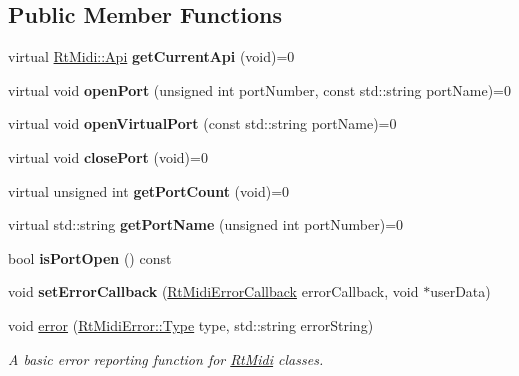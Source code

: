 \subsection*{Public Member Functions}
\begin{DoxyCompactItemize}
\item 
virtual \hyperlink{class_rt_midi_aac66af04a85fe5c5f07c360574a19406}{Rt\+Midi\+::\+Api} {\bfseries get\+Current\+Api} (void)=0\hypertarget{class_midi_api_a9913ffc5863dbb4ac6d4e81d046c665a}{}\label{class_midi_api_a9913ffc5863dbb4ac6d4e81d046c665a}

\item 
virtual void {\bfseries open\+Port} (unsigned int port\+Number, const std\+::string port\+Name)=0\hypertarget{class_midi_api_a0c4a5ef7ab6ff7d223b96671422e352c}{}\label{class_midi_api_a0c4a5ef7ab6ff7d223b96671422e352c}

\item 
virtual void {\bfseries open\+Virtual\+Port} (const std\+::string port\+Name)=0\hypertarget{class_midi_api_a772dc26ec412c19facb71b85db2927fd}{}\label{class_midi_api_a772dc26ec412c19facb71b85db2927fd}

\item 
virtual void {\bfseries close\+Port} (void)=0\hypertarget{class_midi_api_a1410af774a6bcdf85726eb69b94bc918}{}\label{class_midi_api_a1410af774a6bcdf85726eb69b94bc918}

\item 
virtual unsigned int {\bfseries get\+Port\+Count} (void)=0\hypertarget{class_midi_api_a98661c935d597e8ba19ed266287868f5}{}\label{class_midi_api_a98661c935d597e8ba19ed266287868f5}

\item 
virtual std\+::string {\bfseries get\+Port\+Name} (unsigned int port\+Number)=0\hypertarget{class_midi_api_a317393a9094e7c2bf51337adbabe6a71}{}\label{class_midi_api_a317393a9094e7c2bf51337adbabe6a71}

\item 
bool {\bfseries is\+Port\+Open} () const \hypertarget{class_midi_api_ae0cd5322013cc8eddf05fe5d7bdc9314}{}\label{class_midi_api_ae0cd5322013cc8eddf05fe5d7bdc9314}

\item 
void {\bfseries set\+Error\+Callback} (\hyperlink{_rt_midi_8h_a57641d3490f722c3efb9ee1c640e36bb}{Rt\+Midi\+Error\+Callback} error\+Callback, void $\ast$user\+Data)\hypertarget{class_midi_api_a1c90ccc7153045c1059230295d9de8fc}{}\label{class_midi_api_a1c90ccc7153045c1059230295d9de8fc}

\item 
void \hyperlink{class_midi_api_a90114261efbce1a0e3d2a3dcf4459a15}{error} (\hyperlink{class_rt_midi_error_a741314057cec5fb8c743c12f284905ee}{Rt\+Midi\+Error\+::\+Type} type, std\+::string error\+String)\hypertarget{class_midi_api_a90114261efbce1a0e3d2a3dcf4459a15}{}\label{class_midi_api_a90114261efbce1a0e3d2a3dcf4459a15}

\begin{DoxyCompactList}\small\item\em A basic error reporting function for \hyperlink{class_rt_midi}{Rt\+Midi} classes. \end{DoxyCompactList}\end{DoxyCompactItemize}

